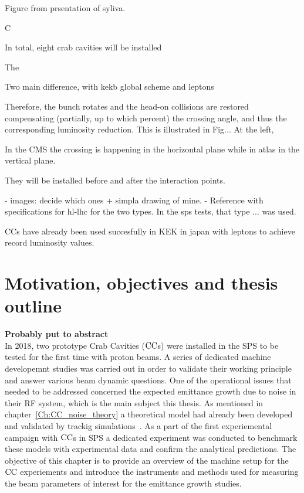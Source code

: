 Figure from prsentation of syliva.





 C

 In total, eight crab cavities will be installed 

The

Two main difference, with kekb global scheme and leptons


Therefore, the bunch rotates and the head-on collisions are restored compensating (partially, up to which percent) the crossing angle, and thus the corresponding luminosity reduction. This is illustrated in Fig... At the left, 


In the CMS the crossing is happening in the horizontal plane while in atlas in the vertical plane.

They will be installed before and after the interaction points. 

- images: decide which ones + simpla drawing of mine.
- Reference with specifications for hl-lhc for the two types. In the sps tests, that type ... was used.


CCs have already been used succesfully in KEK in japan with leptons to achieve record luminosity values.

\section{Motivation, objectives and thesis outline}

\textbf{Probably put to abstract}\\
In 2018, two prototype Crab Cavities (${\mathrm{CC}}$s) were installed in the SPS to be tested for the first time with proton beams. A series of dedicated machine developemnt studies was carried out in order to validate their working principle and answer various beam dynamic questions. One of the operational issues that needed to be addressed concerned the expected emittance growth due to noise in their RF system, which is the main subject this thesis.  As mentioned in chapter~\ref{Ch:CC_noise_theory} a theoretical model had already been developed and validated by trackig simulations~\cite{PhysRevSTAB.18.101001}. 
As a part of the first experiemental campaign with ${\mathrm{CC}}$s in SPS a dedicated experiment was conducted to benchmark these models with experimental data and confirm the analytical predictions. The objective of this chapter is to provide an overview of the machine setup for the ${\mathrm{CC}}$ experiements and introduce the instruments and methods used for measuring the beam parameters of interest for the emittance growth studies.

